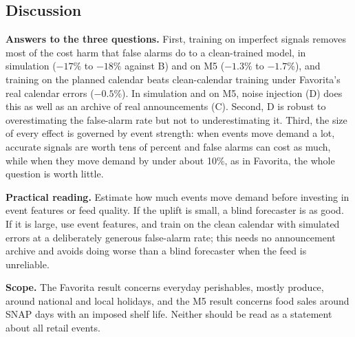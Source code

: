\subsection{Discussion}
\textbf{Answers to the three questions.} First, training on imperfect signals removes most of the cost harm that false alarms do to a clean-trained model, in simulation ($-17\%$ to $-18\%$ against B) and on M5 ($-1.3\%$ to $-1.7\%$), and training on the planned calendar beats clean-calendar training under Favorita's real calendar errors ($-0.5\%$). In simulation and on M5, noise injection (D) does this as well as an archive of real announcements (C). Second, D is robust to overestimating the false-alarm rate but not to underestimating it. Third, the size of every effect is governed by event strength: when events move demand a lot, accurate signals are worth tens of percent and false alarms can cost as much, while when they move demand by under about 10\%, as in Favorita, the whole question is worth little.

\textbf{Practical reading.} Estimate how much events move demand before investing in event features or feed quality. If the uplift is small, a blind forecaster is as good. If it is large, use event features, and train on the clean calendar with simulated errors at a deliberately generous false-alarm rate; this needs no announcement archive and avoids doing worse than a blind forecaster when the feed is unreliable.

\textbf{Scope.} The Favorita result concerns everyday perishables, mostly produce, around national and local holidays, and the M5 result concerns food sales around SNAP days with an imposed shelf life. Neither should be read as a statement about all retail events.

